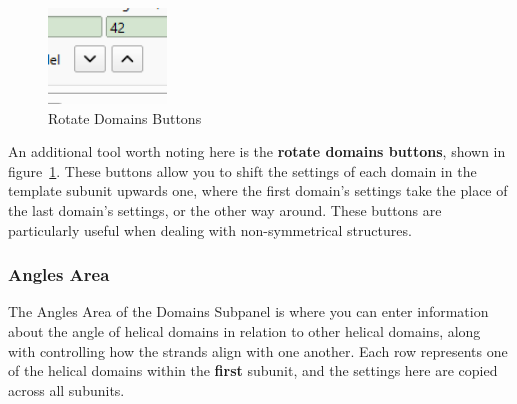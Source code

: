 \documentclass[titlepage]{article}
\begin{document}
\begin{figure}[h] \label{fig:rotate-domains-arrows}
	\caption{Rotate Domains Buttons}
	\centering
	\includegraphics[height=1in]{rotate-domains-arrows.png}
\end{figure}

An additional tool worth noting here is the \textbf{rotate domains buttons}, shown in figure~\ref{fig:rotate-domains-arrows}. These buttons allow you to shift the settings of each domain in the template subunit upwards one, where the first domain's settings take the place of the last domain's settings, or the other way around. These buttons are particularly useful when dealing with non-symmetrical structures.

\subsubsection{Angles Area} \label{sect:domains-tab-angles-area}

The Angles Area of the Domains Subpanel is where you can enter information about the angle of helical domains in relation to other helical domains, along with controlling how the strands align with one another. Each row represents one of the helical domains within the \textbf{first} subunit, and the settings here are copied across all subunits.
\end{document}
